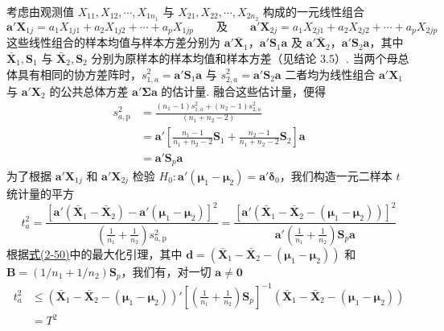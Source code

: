 \quad 考虑由观测值 $X_{11},X_{12},\cdots,X_{1n_1}$ 与 $X_{21},X_{22},\cdots,X_{2n_2}$ 构成的一元线性组合
\[
\boldsymbol{a}'\mathbf{X}_{1j}=a_1X_{1j1}+a_2X_{1j2}+\cdots+a_pX_{1jp}\qquad 及\qquad \boldsymbol{a}'\mathbf{X}_{2j}=a_1X_{2j1}+a_2X_{2j2}+\cdots+a_pX_{2jp}
\]
这些线性组合的样本均值与样本方差分别为 $\boldsymbol{a}'\bar{\mathbf{X}}_1$，$\boldsymbol{a}'\mathbf{S}_1\boldsymbol{a}$ 及 $\boldsymbol{a}'\bar{\mathbf{X}}_2$，$\boldsymbol{a}'\mathbf{S}_2\boldsymbol{a}$，其中 $\bar{\mathbf{X}}_1,\mathbf{S}_1$ 与 $\bar{\mathbf{X}}_2,\mathbf{S}_2$ 分别为原样本的样本均值和样本方差（见结论 3.5）. 当两个母总体具有相同的协方差阵时，$s_{1,a}^2=\boldsymbol{a}'\mathbf{S}_1\boldsymbol{a}$ 与 $s_{2,a}^2=\boldsymbol{a}'\mathbf{S}_2\boldsymbol{a}$ 二者均为线性组合 $\boldsymbol{a}'\mathbf{X}_1$ 与 $\boldsymbol{a}'\mathbf{X}_2$ 的公共总体方差 $\boldsymbol{a}'\boldsymbol{\Sigma}\boldsymbol{a}$ 的估计量. 融合这些估计量，便得
\label{eq:6-25}
\begin{equation}
\begin{aligned}
s_{a,\mathrm{p}}^2&=\frac{(n_1-1)s_{1,a}^2+(n_2-1)s_{2,a}^2}{(n_1+n_2-2)}\\
&=\boldsymbol{a}'\left[\frac{n_1-1}{n_1+n_2-2}\mathbf{S}_1+\frac{n_2-1}{n_1+n_2-2}\mathbf{S}_2\right]\boldsymbol{a}\\
&=\boldsymbol{a}'\mathbf{S}_p\boldsymbol{a}
\end{aligned}
\tag{6-25}
\end{equation}
为了根据 $\boldsymbol{a}'\mathbf{X}_{1j}$ 和 $\boldsymbol{a}'\mathbf{X}_{2j}$ 检验 $H_0: \boldsymbol{a}'(\boldsymbol{\mu}_1-\boldsymbol{\mu}_2)=\boldsymbol{a}'\boldsymbol{\delta}_0$，我们构造一元二样本 $t$ 统计量的平方
\label{eq:6-26}
\begin{equation}
t_a^2=\frac{[\boldsymbol{a}'(\bar{\mathbf{X}}_1-\bar{\mathbf{X}}_2)-\boldsymbol{a}'(\boldsymbol{\mu}_1-\boldsymbol{\mu}_2)]^2}{\left(\frac{1}{n_1}+\frac{1}{n_2}\right)s_{a,\mathrm{p}}^2}=\frac{[\boldsymbol{a}'(\bar{\mathbf{X}}_1-\bar{\mathbf{X}}_2-(\boldsymbol{\mu}_1-\boldsymbol{\mu}_2))]^2}{\boldsymbol{a}'\left(\frac{1}{n_1}+\frac{1}{n_2}\right)\mathbf{S}_p\boldsymbol{a}}
\tag{6-26}
\end{equation}
根据\hyperref[eq:2-50]{式(2-50)}中的最大化引理，其中 $\boldsymbol{d}=(\bar{\mathbf{X}}_1-\bar{\mathbf{X}}_2-(\boldsymbol{\mu}_1-\boldsymbol{\mu}_2))$ 和 $\mathbf{B}=(1/n_1+1/n_2)\mathbf{S}_p$，我们有，对一切 $\boldsymbol{a}\neq\mathbf{0}$
\[
\begin{aligned}
t_a^2&\leqslant (\bar{\mathbf{X}}_1-\bar{\mathbf{X}}_2-(\boldsymbol{\mu}_1-\boldsymbol{\mu}_2))'\left[\left(\frac{1}{n_1}+\frac{1}{n_2}\right)\mathbf{S}_p\right]^{-1}(\bar{\mathbf{X}}_1-\bar{\mathbf{X}}_2-(\boldsymbol{\mu}_1-\boldsymbol{\mu}_2))\\
&=T^2
\end{aligned}
\]
